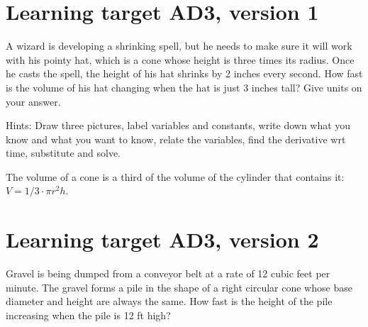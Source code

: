 
\usepackage{pgfplots}


%


\allowdisplaybreaks
\section{Learning target AD3, version 1}

A wizard is developing a shrinking spell, but he needs to make sure it will work with his pointy hat, which is a cone whose height is three times its radius. Once he casts the spell, the height of his hat shrinks by 2 inches every second. How fast is the volume of his hat changing when the hat is just 3 inches tall? Give units on your answer.

\vspace{1em}

{\tiny Hints: Draw three pictures, label variables and constants, write down what you know and what you want to know, relate the variables, find the derivative wrt time, substitute and solve. 

The volume of a cone is a third of the volume of the cylinder that contains it: $V = 1/3 \cdot \pi r^2 h$.}


\pagebreak
\section{Learning target AD3, version 2}


Gravel is being dumped from a conveyor belt at a rate of 12 cubic feet per minute. The gravel forms a pile in the shape of a right circular cone whose base diameter and height are always the same. How fast is the height of the pile increasing when the pile is 12 ft high? 


